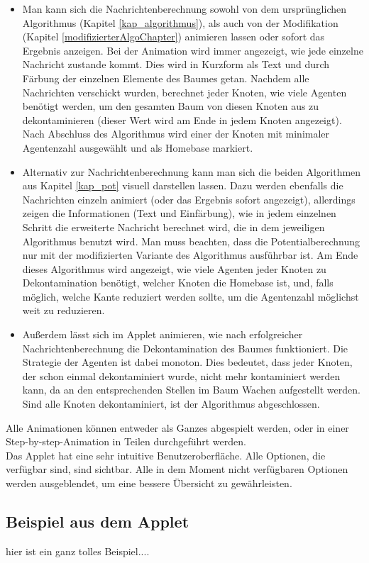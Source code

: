 \begin{itemize}
	\item Man kann sich die Nachrichtenberechnung sowohl von dem ursprünglichen Algorithmus (Kapitel \ref{kap_algorithmus}), als auch von der Modifikation (Kapitel \ref{modifizierterAlgoChapter}) animieren lassen oder sofort das Ergebnis anzeigen. Bei der Animation wird immer angezeigt, wie jede einzelne Nachricht zustande kommt. Dies wird in Kurzform als Text und durch Färbung der einzelnen Elemente des Baumes getan. Nachdem alle Nachrichten verschickt wurden, berechnet jeder Knoten, wie viele Agenten benötigt werden, um den gesamten Baum von diesen Knoten aus zu dekontaminieren (dieser Wert wird am Ende in jedem Knoten angezeigt). Nach Abschluss des Algorithmus wird einer der Knoten mit minimaler Agentenzahl ausgewählt und als Homebase markiert.
	
	\item Alternativ zur Nachrichtenberechnung kann man sich die beiden Algorithmen aus Kapitel \ref{kap_pot} visuell darstellen lassen. Dazu werden ebenfalls die Nachrichten einzeln animiert (oder das Ergebnis sofort angezeigt), allerdings zeigen die Informationen (Text und Einfärbung), wie in jedem einzelnen Schritt die erweiterte Nachricht berechnet wird, die in dem jeweiligen Algorithmus benutzt wird. Man muss beachten, dass die Potentialberechnung nur mit der modifizierten Variante des Algorithmus ausführbar ist. Am Ende dieses Algorithmus wird angezeigt, wie viele Agenten jeder Knoten zu Dekontamination benötigt, welcher Knoten die Homebase ist, und, falls möglich, welche Kante reduziert werden sollte, um die Agentenzahl möglichst weit zu reduzieren.
	
	\item Außerdem lässt sich im Applet animieren, wie nach erfolgreicher Nachrichtenberechnung die Dekontamination des Baumes funktioniert. Die Strategie der Agenten ist dabei monoton. Dies bedeutet, dass jeder Knoten, der schon einmal dekontaminiert wurde, nicht mehr kontaminiert werden kann, da an den entsprechenden Stellen im Baum Wachen aufgestellt werden. Sind alle Knoten dekontaminiert, ist der Algorithmus abgeschlossen.
\end{itemize}

Alle Animationen können entweder als Ganzes abgespielt werden, oder in einer Step-by-step-Animation in Teilen durchgeführt werden. \\
Das Applet hat eine sehr intuitive Benutzeroberfläche. Alle Optionen, die verfügbar sind, sind sichtbar. Alle in dem Moment nicht verfügbaren Optionen werden ausgeblendet, um eine bessere Übersicht zu gewährleisten.


\subsection{Beispiel aus dem Applet}

hier ist ein ganz tolles Beispiel....